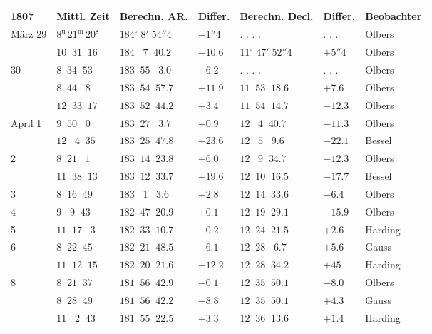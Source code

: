 \begingroup\fontsize{9}{11}\selectfont\setlength{\tabcolsep}{2.5pt}\renewcommand{\arraystretch}{1.10}
\begin{longtable}{l|l|l|l|l|l|l}
1807 & Mittl. Zeit & Berechn. AR. & Differ. & Berechn. Decl. & Differ. & Beobachter \\
\hline
März 29 & $8^{\mathrm u}\,21^{\mathrm m}\,20^{\mathrm s}$ & $184^\circ\;8'\;54''4$ & $-1''4$ & . . . . & . . . & Olbers \\
        & $10\;\;31\;\;16$ & $184\;\;\;7\;\;40.2$ & $-10.6$ & $11^\circ\;47'\;52''4$ & $+5''4$ & Olbers \\
30      & $8\;\;34\;\;53$ & $183\;\;55\;\;\;3.0$ & $+6.2$ & . . . . & . . . & Olbers \\
        & $8\;\;44\;\;\;8$ & $183\;\;54\;\;57.7$ & $+11.9$ & $11\;\;53\;\;18.6$ & $+7.6$ & Olbers \\
        & $12\;\;33\;\;17$ & $183\;\;52\;\;44.2$ & $+3.4$ & $11\;\;54\;\;14.7$ & $-12.3$ & Olbers \\
April 1 & $9\;\;50\;\;\;0$ & $183\;\;27\;\;\;3.7$ & $+0.9$ & $12\;\;\;4\;\;40.7$ & $-11.3$ & Olbers \\
        & $12\;\;\;4\;\;35$ & $183\;\;25\;\;47.8$ & $+23.6$ & $12\;\;\;5\;\;\;9.6$ & $-22.1$ & Bessel \\
2       & $8\;\;21\;\;\;1$ & $183\;\;14\;\;23.8$ & $+6.0$ & $12\;\;\;9\;\;34.7$ & $-12.3$ & Olbers \\
        & $11\;\;38\;\;13$ & $183\;\;12\;\;33.7$ & $+19.6$ & $12\;\;10\;\;16.5$ & $-17.7$ & Bessel \\
3       & $8\;\;16\;\;49$ & $183\;\;\;1\;\;\;3.6$ & $+2.8$ & $12\;\;14\;\;33.6$ & $-6.4$ & Olbers \\
4       & $9\;\;\;9\;\;43$ & $182\;\;47\;\;20.9$ & $+0.1$ & $12\;\;19\;\;29.1$ & $-15.9$ & Olbers \\
5       & $11\;\;17\;\;\;3$ & $182\;\;33\;\;10.7$ & $-0.2$ & $12\;\;24\;\;21.5$ & $+2.6$ & Harding \\
6       & $8\;\;22\;\;45$ & $182\;\;21\;\;48.5$ & $-6.1$ & $12\;\;28\;\;\;6.7$ & $+5.6$ & Gauss \\
        & $11\;\;12\;\;15$ & $182\;\;20\;\;21.6$ & $-12.2$ & $12\;\;28\;\;34.2$ & $+45$ & Harding \\
8       & $8\;\;21\;\;37$ & $181\;\;56\;\;42.9$ & $-0.1$ & $12\;\;35\;\;50.1$ & $-8.0$ & Olbers \\
        & $8\;\;28\;\;49$ & $181\;\;56\;\;42.2$ & $-8.8$ & $12\;\;35\;\;50.1$ & $+4.3$ & Gauss \\
        & $11\;\;\;2\;\;43$ & $181\;\;55\;\;22.5$ & $+3.3$ & $12\;\;36\;\;13.6$ & $+1.4$ & Harding \\

\end{longtable}

